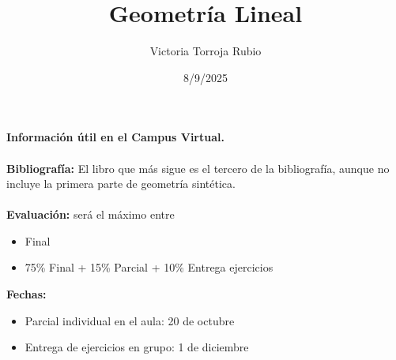 \documentclass{report}
\begin{document}
\title{Geometría Lineal}
\author{Victoria Torroja Rubio}
\date{8/9/2025}

\maketitle

\tableofcontents

\pagebreak

\textbf{Información útil en el Campus Virtual.} \\ \\
\textbf{Bibliografía:} El libro que más sigue es el tercero de la bibliografía, aunque no incluye la primera parte de geometría sintética. \\ \\
\textbf{Evaluación:} será el máximo entre
\begin{itemize}
\item Final
\item 75\% Final + 15\% Parcial + 10\% Entrega ejercicios
\end{itemize}
\textbf{Fechas:} 
\begin{itemize}
\item Parcial individual en el aula: 20 de octubre
\item Entrega de ejercicios en grupo: 1 de diciembre
\end{itemize}




\end{document}
